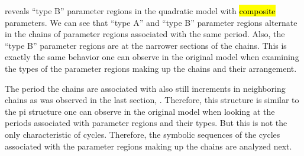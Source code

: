  reveals ``type B'' parameter regions in the quadratic model with \hl{composite} parameters.
We can see that ``type A'' and ``type B'' parameter regions alternate in the chains of parameter regions associated with the same period.
Also, the ``type B'' parameter regions are at the narrower sections of the chains.
This is exactly the same behavior one can observe in the original model when examining the types of the parameter regions making up the chains and their arrangement.

The period the chains are associated with also still increments in neighboring chains as was observed in the last section, .
Therefore, this structure is similar to the \gls{pi} structure one can observe in the original model when looking at the periods associated with parameter regions and their types.
But this is not the only characteristic of cycles.
Therefore, the symbolic sequences of the cycles associated with the parameter regions making up the chains are analyzed next.

